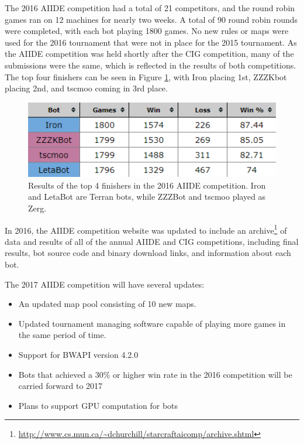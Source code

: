 The 2016 AIIDE competition had a total of 21 competitors, and the round robin games ran on 12 machines for nearly two weeks. A total of 90 round robin rounds were completed, with each bot playing 1800 games. No new rules or maps were used for the 2016 tournament that were not in place for the 2015 tournament. As the AIIDE competition was held shortly after the CIG competition, many of the submissions were the same, which is reflected in the results of both competitions. The top four finishers can be seen in Figure \ref{figAIIDEresults}, with Iron placing 1st, ZZZKbot placing 2nd, and tscmoo coming in 3rd place.

\vskip 2mm
\begin{figure}[h]
  \centering
  \includegraphics[width=1\columnwidth]{fig/aiide2016.png}
  \caption{Results of the top 4 finishers in the 2016 AIIDE competition. Iron and LetaBot are Terran bots, while ZZZBot and tscmoo played as Zerg.}
  \label{figAIIDEresults}
\end{figure}

In 2016, the AIIDE competition website was updated to include an archive\footnote{\url{http://www.cs.mun.ca/~dchurchill/starcraftaicomp/archive.shtml}} of data and results of all of the annual AIIDE and CIG competitions, including final results, bot source code and binary download links, and information about each bot. 

The 2017 AIIDE competition will have several updates:

\begin{itemize}
\item An updated map pool consisting of 10 new maps.
\item Updated tournament managing software capable of playing more games in the same period of time.
\item Support for BWAPI version 4.2.0
\item Bots that achieved a 30\% or higher win rate in the 2016 competition will be carried forward to 2017
\item Plans to support GPU computation for bots
\end{itemize}

\vskip 6mm